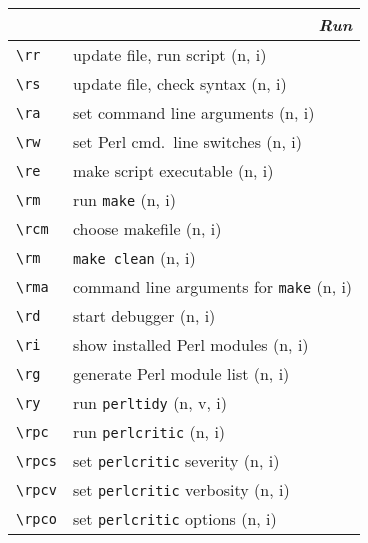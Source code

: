 \documentclass[oneside,10pt,landscape,DIV17]{scrartcl}
\begin{document}
%
\newpage
%
%
\begin{multicols}{2}
%
\begin{tabular}[]{|p{11mm}|p{61mm}|}
\hline
\multicolumn{2}{|r|}{\textsl{\textbf{R}un}} \\[1.0ex]
\hline \verb'\rr'    & update file, run script                  \hfill (n, i)   \\
\hline \verb'\rs'    & update file, check syntax                \hfill (n, i)   \\
\hline \verb'\ra'    & set command line arguments               \hfill (n, i)   \\
\hline \verb'\rw'    & set Perl cmd.\ line switches             \hfill (n, i)   \\
\hline \verb'\re'    & make script executable                   \hfill (n, i)   \\
\hline \verb'\rm'    & run \texttt{make}                        \hfill (n, i)   \\
\hline \verb'\rcm'   & choose makefile                          \hfill (n, i)   \\
\hline \verb'\rm'    & \texttt{make clean}                      \hfill (n, i)   \\
\hline \verb'\rma'   & command line arguments for \texttt{make} \hfill (n, i)   \\
\hline \verb'\rd'    & start debugger                           \hfill (n, i)   \\
\hline \verb'\ri'    & show installed Perl modules              \hfill (n, i)   \\
\hline \verb'\rg'    & generate Perl module list                \hfill (n, i)   \\
\hline \verb'\ry'    & run \verb'perltidy'                      \hfill (n, v, i)\\
\hline \verb'\rpc'   & run \verb'perlcritic'                    \hfill (n, i)   \\
\hline \verb'\rpcs'  & set \verb'perlcritic' severity           \hfill (n, i)   \\
\hline \verb'\rpcv'  & set \verb'perlcritic' verbosity          \hfill (n, i)   \\
\hline \verb'\rpco'  & set \verb'perlcritic' options            \hfill (n, i)   \\

\end{tabular}
\end{multicols}
\end{document}

